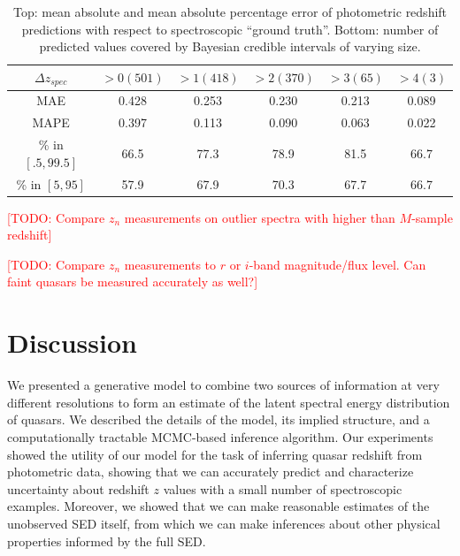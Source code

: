 \documentclass{article}
\newcommand{\red}[1]{\textcolor{red}{[TODO: #1]}}
\begin{document}
\begin{table}[ht]
\caption{Top: mean absolute and mean absolute percentage error of photometric redshift predictions with respect to spectroscopic ``ground truth''.  Bottom: number of predicted values covered by Bayesian credible intervals of varying size. }
\label{tab:error}
\vskip 0.15in
\begin{center}
\begin{small}
\begin{sc}
\begin{tabular*}{0.75\textwidth}{cccccc}
\hline
\abovespace\belowspace
  $\Delta z_{spec}$ &  $ > 0 (501)$ & $ > 1 (418)$ & $ > 2 (370)$ & $ > 3 (65)$ & $ > 4 (3)$ \\
\hline
\abovespace
MAE &  0.428 & 0.253 & 0.230 & 0.213 & 0.089 \\
MAPE &  0.397 & 0.113 & 0.090 & 0.063 & 0.022 \\
\hline
\% in $[.5, 99.5]$ &  66.5 & 77.3 & 78.9 & 81.5 & 66.7 \\
\% in $[5, 95]$    &  57.9 & 67.9 & 70.3 & 67.7 & 66.7 \\
\hline
\end{tabular*}
\end{sc}
\end{small}
\end{center}
\vskip -0.1in
\end{table}


\red{Compare $z_n$ measurements on outlier spectra with higher than $M$-sample redshift}

\red{Compare $z_n$ measurements to $r$ or $i$-band magnitude/flux level.  Can faint quasars be measured accurately as well?}

\section{Discussion}
We presented a generative model to combine two sources of information at very different resolutions to form an estimate of the latent spectral energy distribution of quasars.  We described the details of the model, its implied structure, and a computationally tractable MCMC-based inference algorithm. 
Our experiments showed the utility of our model for the task of inferring quasar redshift from photometric data, showing that we can accurately predict and characterize uncertainty about redshift $z$ values with a small number of spectroscopic examples.  
Moreover, we showed that we can make reasonable estimates of the unobserved SED itself, from which we can make inferences about other physical properties informed by the full SED.  
 
\end{document}
